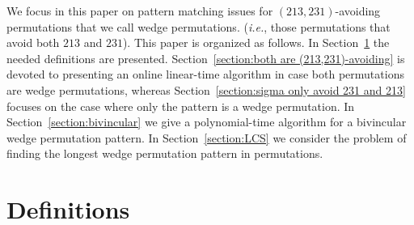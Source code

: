 \documentclass[a4paper]{llncs}
\newcounter{num}
\begin{document}
We focus in this paper on pattern matching issues for
$(213,231)$-avoiding permutations that we call wedge permutations.
(\emph{i.e.}, those permutations that avoid both $213$ and $231$).
This paper is organized as follows.
In Section~\ref{section:Definitions} the needed definitions are presented.
Section~\ref{section:both are (213,231)-avoiding} is devoted to presenting
an online linear-time algorithm in case both
permutations are wedge permutations,
whereas Section~\ref{section:sigma only avoid 231 and 213} focuses on the case
where only the pattern is a wedge permutation.
In Section~\ref{section:bivincular} we give a polynomial-time algorithm
for a bivincular wedge permutation pattern.
In Section~\ref{section:LCS} we consider the problem of finding the longest
wedge permutation pattern in permutations.



\section{Definitions}
\label{section:Definitions}
\end{document}
